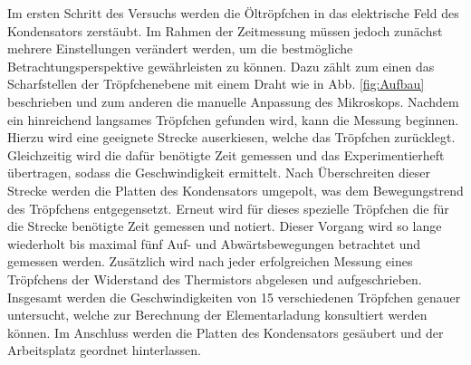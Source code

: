 Im ersten Schritt des Versuchs werden die Öltröpfchen in das elektrische Feld des Kondensators zerstäubt. Im Rahmen der Zeitmessung 
müssen jedoch zunächst mehrere Einstellungen verändert werden, um die bestmögliche Betrachtungsperspektive gewährleisten zu 
können. Dazu zählt zum einen das Scharfstellen der Tröpfchenebene mit einem Draht wie in Abb. \ref{fig:Aufbau} beschrieben und zum
anderen die manuelle Anpassung des Mikroskops. Nachdem ein hinreichend langsames Tröpfchen gefunden wird, kann die Messung beginnen.
Hierzu wird eine geeignete Strecke auserkiesen, welche das Tröpfchen zurücklegt. Gleichzeitig wird die dafür benötigte Zeit gemessen
und das Experimentierheft übertragen, sodass die Geschwindigkeit ermittelt. Nach Überschreiten dieser Strecke werden die Platten
des Kondensators umgepolt, was dem Bewegungstrend des Tröpfchens entgegensetzt. Erneut wird für dieses spezielle Tröpfchen die für 
die Strecke benötigte Zeit gemessen und notiert. Dieser Vorgang wird so lange wiederholt bis maximal fünf Auf- und 
Abwärtsbewegungen betrachtet und gemessen werden. Zusätzlich wird nach jeder erfolgreichen Messung eines Tröpfchens der Widerstand 
des Thermistors abgelesen und aufgeschrieben.\\

\noindent Insgesamt werden die Geschwindigkeiten von 15 verschiedenen Tröpfchen genauer untersucht, welche zur Berechnung der
Elementarladung konsultiert werden können. Im Anschluss werden die Platten des Kondensators gesäubert und der Arbeitsplatz geordnet
hinterlassen.



